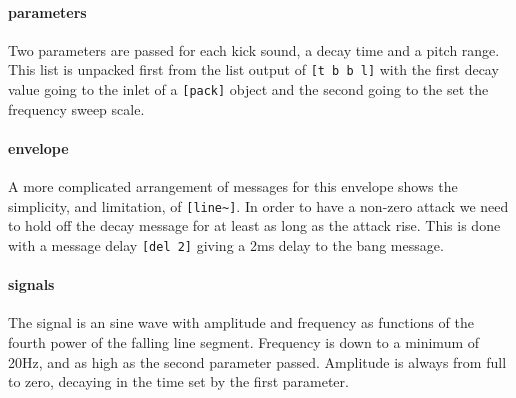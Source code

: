 \paragraph{parameters}
Two parameters are passed for each kick sound, a decay time
and a pitch range. This list is unpacked first from the 
list output of \verb+[t b b l]+ with the first decay value going
to the inlet of a \verb+[pack]+ object and the second going
to the set the frequency sweep scale.

\paragraph{envelope}
A more complicated arrangement of messages for this
envelope shows the simplicity, and limitation, of \verb+[line~]+. In order
to have a non-zero attack we need to hold off the decay message
for at least as long as the attack rise. This is done with a message
delay \verb+[del 2]+ giving a 2ms delay to the bang message.

\paragraph{signals}
The signal is an sine wave with amplitude and frequency as
functions of the fourth power of the falling line segment. Frequency
is down to a minimum of 20Hz, and as high as the second parameter passed.
Amplitude is always from full to zero, decaying in the time set by the first
parameter.